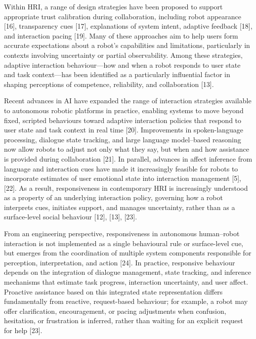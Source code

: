 \documentclass[
  letterpaper,
  DIV=11,
  numbers=noendperiod]{scrartcl}
\begin{document}
Within HRI, a range of design strategies have been proposed to support
appropriate trust calibration during collaboration, including robot
appearance {[}16{]}, transparency cues {[}17{]}, explanations of system
intent, adaptive feedback {[}18{]}, and interaction pacing {[}19{]}.
Many of these approaches aim to help users form accurate expectations
about a robot's capabilities and limitations, particularly in contexts
involving uncertainty or partial observability. Among these strategies,
adaptive interaction behaviour---how and when a robot responds to user
state and task context---has been identified as a particularly
influential factor in shaping perceptions of competence, reliability,
and collaboration {[}13{]}.

Recent advances in AI have expanded the range of interaction strategies
available to autonomous robotic platforms in practice, enabling systems
to move beyond fixed, scripted behaviours toward adaptive interaction
policies that respond to user state and task context in real time
{[}20{]}. Improvements in spoken-language processing, dialogue state
tracking, and large language model--based reasoning now allow robots to
adjust not only what they say, but when and how assistance is provided
during collaboration {[}21{]}. In parallel, advances in affect inference
from language and interaction cues have made it increasingly feasible
for robots to incorporate estimates of user emotional state into
interaction management {[}5{]}, {[}22{]}. As a result, responsiveness in
contemporary HRI is increasingly understood as a property of an
underlying interaction policy, governing how a robot interprets cues,
initiates support, and manages uncertainty, rather than as a
surface-level social behaviour {[}12{]}, {[}13{]}, {[}23{]}.

From an engineering perspective, responsiveness in autonomous
human--robot interaction is not implemented as a single behavioural rule
or surface-level cue, but emerges from the coordination of multiple
system components responsible for perception, interpretation, and action
{[}24{]}. In practice, responsive behaviour depends on the integration
of dialogue management, state tracking, and inference mechanisms that
estimate task progress, interaction uncertainty, and user affect.
Proactive assistance based on this integrated state representation
differs fundamentally from reactive, request-based behaviour; for
example, a robot may offer clarification, encouragement, or pacing
adjustments when confusion, hesitation, or frustration is inferred,
rather than waiting for an explicit request for help {[}23{]}.
\end{document}

